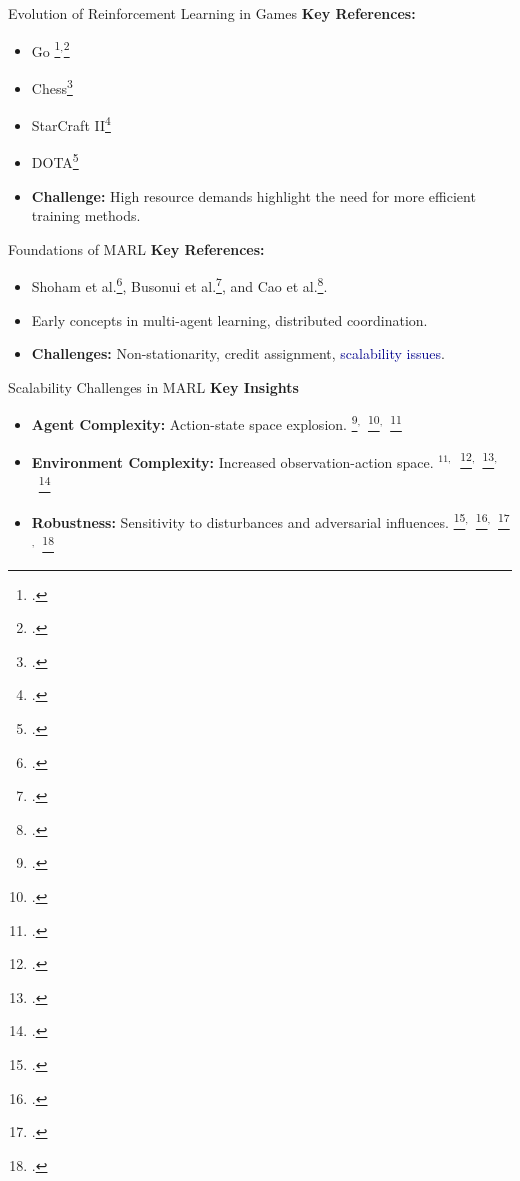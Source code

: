 

\begin{frame}{Evolution of Reinforcement Learning in Games}
    \textbf{Key References:}
    \begin{itemize}
        \item Go \footcite{silver2016}$^,$\footcite{silver2017}
        \item Chess\footcite{silver2017a}
        \item StarCraft II\footcite{vinyals2019}
        \item DOTA\footcite{berner2019}
        \item \textbf{Challenge:} High resource demands highlight the need for more efficient 
            training methods.
    \end{itemize}
\end{frame}

\begin{frame}{Foundations of MARL}
    \textbf{Key References:}
    \begin{itemize}
        \item Shoham et al.\footcite{shoham2007a}, Busonui et al.\footcite{busoniu2008}, 
            and Cao et al.\footcite{cao2012}.
        \item Early concepts in multi-agent learning, distributed coordination.
        \item \textbf{Challenges:} Non-stationarity, credit assignment, 
            \textcolor{DarkBlue}{scalability issues}.
    \end{itemize}
\end{frame}

\begin{frame}{Scalability Challenges in MARL}
    \textbf{Key Insights}
    \begin{itemize}
        \item \textbf{Agent Complexity:} Action-state space explosion.
            \footcite{lillicrap2019}$^,$~\footcite{baker2019}$^,$~\footcite{leibo2021}
        \item \textbf{Environment Complexity:} Increased observation-action space.
            $^{11,}$~\footcite{ye2020}$^,$~\footcite{shukla2022}$^,$~\footcite{liang2024}
        \item \textbf{Robustness:} Sensitivity to disturbances and adversarial influences.
            \footcite{gleave2021}$^,$~\footcite{li2019}$^,$~\footcite{spooner2020}$^,$~\footcite{guo2022}
    \end{itemize}
    \vspace{0.5em}
\end{frame}

